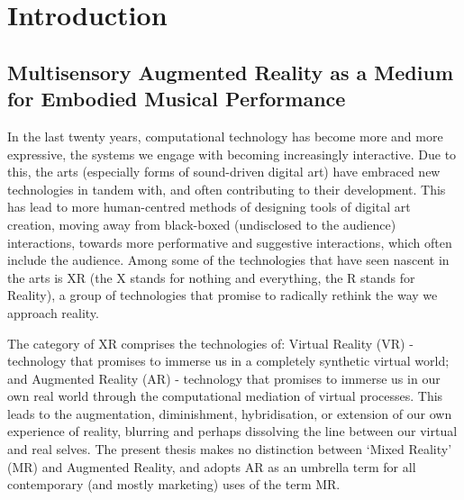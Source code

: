 \chapter{Introduction}
\label{sec: introduction}
\epigraph{\emph{}}{\citep{bilbow2022}}

\section{Multisensory Augmented Reality as a Medium for Embodied Musical Performance}\label{sec: introduction-summary}
In the last twenty years, computational technology has become more and more expressive, the systems we engage with becoming increasingly interactive. Due to this, the arts (especially forms of sound-driven digital art) have embraced new technologies in tandem with, and often contributing to their development. This has lead to more human-centred methods of designing tools of digital art creation, moving away from black-boxed (undisclosed to the audience) interactions, towards more performative and suggestive interactions, which often include the audience. Among some of the technologies that have seen nascent in the arts is XR (the X stands for nothing and everything, the R stands for Reality), a group of technologies that promise to radically rethink the way we approach reality. 

The category of XR comprises the technologies of: Virtual Reality (VR) - technology that promises to immerse us in a completely synthetic virtual world; and Augmented Reality (AR) -  technology that promises to immerse us in our own real world through the computational mediation of virtual processes. This leads to the augmentation, diminishment, hybridisation, or extension of our own experience of reality, blurring and perhaps dissolving the line between our virtual and real selves. The present thesis makes no distinction between `Mixed Reality' (MR) and Augmented Reality, and adopts AR as an umbrella term for all contemporary (and mostly marketing) uses of the term MR.

